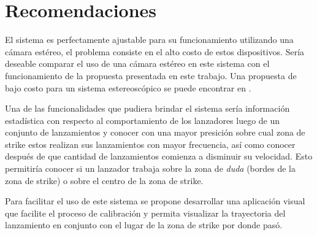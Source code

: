\chapter*{Recomendaciones}\label{chapter:Recomendations}

El sistema es perfectamente ajustable para su funcionamiento utilizando una cámara estéreo, el problema consiste en el alto costo de estos dispositivos. Sería deseable comparar el uso de una cámara estéreo en este sistema con el funcionamiento de la propuesta presentada en este trabajo. Una propuesta de bajo costo para un sistema estereoscópico se puede encontrar en \cite{DVD}.

Una de las funcionalidades que pudiera brindar el sistema sería información estadística con respecto al comportamiento de los lanzadores luego de un conjunto de lanzamientos y conocer con una mayor presición sobre cual zona de strike estos realizan sus lanzamientos con mayor frecuencia, así como conocer después de que cantidad de lanzamientos comienza a disminuir su velocidad. Esto permitiría conocer si un lanzador trabaja sobre la zona de \textit{duda} (bordes de la zona de strike) o sobre el centro de la zona de strike.

Para facilitar el uso de este sistema se propone desarrollar una aplicación visual que facilite el proceso de calibración y permita visualizar la trayectoria del lanzamiento en conjunto con el lugar de la zona de strike por donde pasó.
